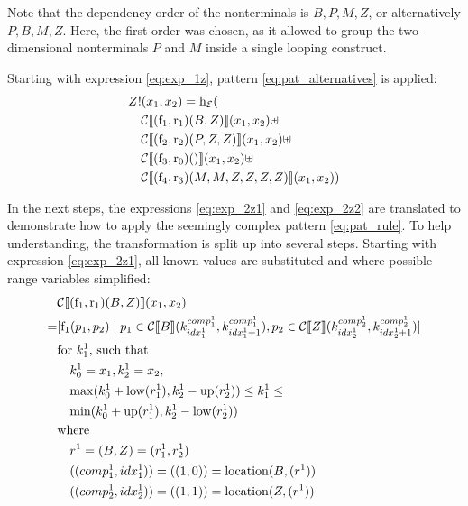 \documentclass[
    a4paper,
    12pt,
    twoside,
    BCOR=12mm,
    parskip=half,
    chapterprefix,
    numbers=noenddot,
    bibliography=totoc
]{scrbook}
\begin{document}
Note that the dependency order of the nonterminals is $B,P,M,Z$, or alternatively $P,B,M,Z$. Here, the first order was chosen, as it allowed to group the two-dimensional nonterminals $P$ and $M$ inside a single looping construct.

Starting with expression \ref{eq:exp_1z}, pattern \ref{eq:pat_alternatives} is applied:
\begin{align}
  &Z!(x_1,x_2) = \op{h}_\mathcal{E}( \nonumber\\
  &\quad \mathcal{C}\llbracket (\op{f}_1,\op{r}_1)(B,Z) \rrbracket(x_1,x_2) \uplus \label{eq:exp_2z1} \\
  &\quad \mathcal{C}\llbracket (\op{f}_2,\op{r}_2)(P,Z,Z) \rrbracket(x_1,x_2) \uplus \label{eq:exp_2z2} \\
  &\quad \mathcal{C}\llbracket (\op{f}_3,\op{r}_0)() \rrbracket(x_1,x_2) \uplus \nonumber\\
  &\quad \mathcal{C}\llbracket (\op{f}_4,\op{r}_3)(M,M,Z,Z,Z,Z) \rrbracket(x_1,x_2) ) \nonumber
\end{align}

In the next steps, the expressions \ref{eq:exp_2z1} and \ref{eq:exp_2z2} are translated to demonstrate how to apply the seemingly complex pattern \ref{eq:pat_rule}. To help understanding, the transformation is split up into several steps. Starting with expression \ref{eq:exp_2z1}, all known values are substituted and where possible range variables simplified:
\begin{align*}
    &\mathcal{C} \llbracket (\op{f}_1,\op{r}_1)(B,Z) \rrbracket (x_1,x_2) \\
  = &[ \op{f}_1(p_1,p_2) \mid p_1 \in \mathcal{C}\llbracket B \rrbracket (k^{comp^1_1}_{idx^1_1},k^{comp^1_1}_{idx^1_1 + 1}),	p_2 \in \mathcal{C}\llbracket Z \rrbracket (k^{comp^1_2}_{idx^1_2},k^{comp^1_2}_{idx^1_2 + 1}) ] \\
    &\text{for $k^1_1$, such that}\\
    &\quad k^1_0 = x_1, k^1_2 = x_2,\\
    &\quad\!\max(k^1_0 + \op{low}(r^1_1), k^1_2 - \op{up}(r^1_2)) \leq k^1_1 \leq\\
    &\quad\!\min(k^1_0 + \op{up}(r^1_1), k^1_2 - \op{low}(r^1_2))\\
    &\text{where}\\
    &\quad r^1 = (B,Z) = (r^1_1, r^1_2)\\
    &\quad ((comp^1_1, idx^1_1))=((1,0))=\op{location}(B,(r^1))\\
    &\quad ((comp^1_2, idx^1_2))=((1,1))=\op{location}(Z,(r^1))
\end{align*}
\end{document}

